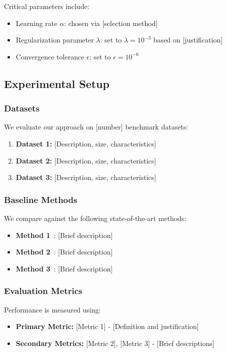 Critical parameters include:
\begin{itemize}
    \item Learning rate $\alpha$: chosen via [selection method]
    \item Regularization parameter $\lambda$: set to $\lambda = 10^{-3}$ based on [justification]
    \item Convergence tolerance $\epsilon$: set to $\epsilon = 10^{-6}$
\end{itemize}

\subsection{Experimental Setup}
\label{subsec:experimental_setup}

\subsubsection{Datasets}

We evaluate our approach on [number] benchmark datasets:
\begin{enumerate}
    \item \textbf{Dataset 1:} [Description, size, characteristics]
    \item \textbf{Dataset 2:} [Description, size, characteristics]
    \item \textbf{Dataset 3:} [Description, size, characteristics]
\end{enumerate}

\subsubsection{Baseline Methods}

We compare against the following state-of-the-art methods:
\begin{itemize}
    \item \textbf{Method 1}~\cite{baseline1}: [Brief description]
    \item \textbf{Method 2}~\cite{baseline2}: [Brief description]
    \item \textbf{Method 3}~\cite{baseline3}: [Brief description]
\end{itemize}

\subsubsection{Evaluation Metrics}

Performance is measured using:
\begin{itemize}
    \item \textbf{Primary Metric:} [Metric 1] - [Definition and justification]
    \item \textbf{Secondary Metrics:} [Metric 2], [Metric 3] - [Brief descriptions]
\end{itemize}
